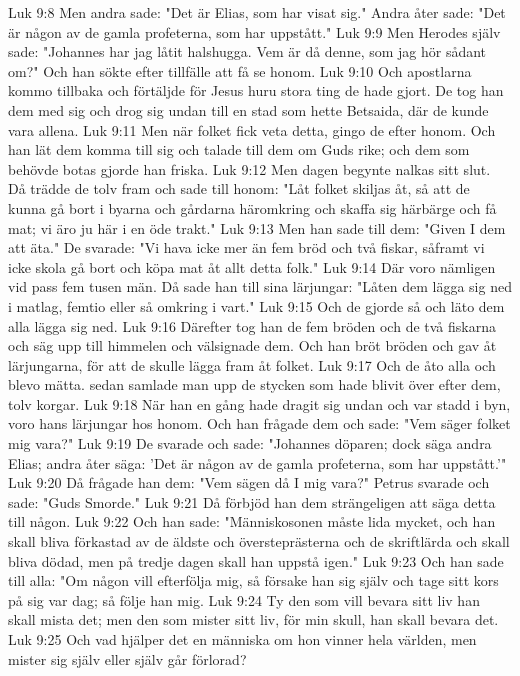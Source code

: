 Luk 9:8  Men andra sade: "Det är Elias, som har visat sig." Andra åter sade: "Det är någon av de gamla profeterna, som har uppstått."
Luk 9:9  Men Herodes själv sade: "Johannes har jag låtit halshugga. Vem är då denne, som jag hör sådant om?" Och han sökte efter tillfälle att få se honom.
Luk 9:10  Och apostlarna kommo tillbaka och förtäljde för Jesus huru stora ting de hade gjort. De tog han dem med sig och drog sig undan till en stad som hette Betsaida, där de kunde vara allena.
Luk 9:11  Men när folket fick veta detta, gingo de efter honom. Och han lät dem komma till sig och talade till dem om Guds rike; och dem som behövde botas gjorde han friska.
Luk 9:12  Men dagen begynte nalkas sitt slut. Då trädde de tolv fram och sade till honom: "Låt folket skiljas åt, så att de kunna gå bort i byarna och gårdarna häromkring och skaffa sig härbärge och få mat; vi äro ju här i en öde trakt."
Luk 9:13  Men han sade till dem: "Given I dem att äta." De svarade: "Vi hava icke mer än fem bröd och två fiskar, såframt vi icke skola gå bort och köpa mat åt allt detta folk."
Luk 9:14  Där voro nämligen vid pass fem tusen män. Då sade han till sina lärjungar: "Låten dem lägga sig ned i matlag, femtio eller så omkring i vart."
Luk 9:15  Och de gjorde så och läto dem alla lägga sig ned.
Luk 9:16  Därefter tog han de fem bröden och de två fiskarna och säg upp till himmelen och välsignade dem. Och han bröt bröden och gav åt lärjungarna, för att de skulle lägga fram åt folket.
Luk 9:17  Och de åto alla och blevo mätta. sedan samlade man upp de stycken som hade blivit över efter dem, tolv korgar.
Luk 9:18  När han en gång hade dragit sig undan och var stadd i byn, voro hans lärjungar hos honom. Och han frågade dem och sade: "Vem säger folket mig vara?"
Luk 9:19  De svarade och sade: "Johannes döparen; dock säga andra Elias; andra åter säga: 'Det är någon av de gamla profeterna, som har uppstått.'"
Luk 9:20  Då frågade han dem: "Vem sägen då I mig vara?" Petrus svarade och sade: "Guds Smorde."
Luk 9:21  Då förbjöd han dem strängeligen att säga detta till någon.
Luk 9:22  Och han sade: "Människosonen måste lida mycket, och han skall bliva förkastad av de äldste och översteprästerna och de skriftlärda och skall bliva dödad, men på tredje dagen skall han uppstå igen."
Luk 9:23  Och han sade till alla: "Om någon vill efterfölja mig, så försake han sig själv och tage sitt kors på sig var dag; så följe han mig.
Luk 9:24  Ty den som vill bevara sitt liv han skall mista det; men den som mister sitt liv, för min skull, han skall bevara det.
Luk 9:25  Och vad hjälper det en människa om hon vinner hela världen, men mister sig själv eller själv går förlorad?

